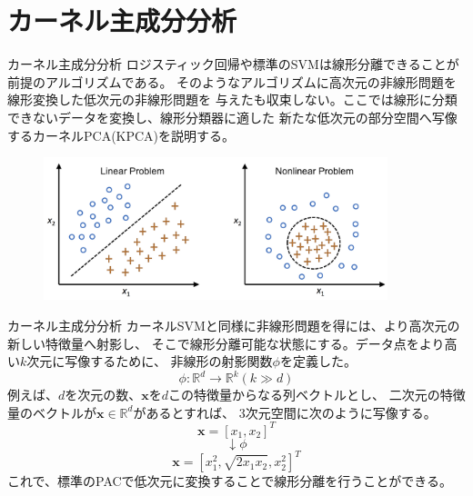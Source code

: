 \documentclass[aspectratio=169, dvipdfmx, 11pt]{beamer} %
\begin{document}
\section{カーネル主成分分析}
\begin{frame}{カーネル主成分分析}
    ロジスティック回帰や標準のSVMは線形分離できることが前提のアルゴリズムである。
    そのようなアルゴリズムに高次元の非線形問題を線形変換した低次元の非線形問題を
    与えたも収束しない。ここでは線形に分類できないデータを変換し、線形分類器に適した
    新たな低次元の部分空間へ写像するカーネルPCA(KPCA)を説明する。
    \begin{figure}[b]
        \begin{center}
        \includegraphics[width=100mm]{img/day05/fig03.png}
        \end{center}
    \end{figure}
\end{frame}

\begin{frame}{カーネル主成分分析}
    カーネルSVMと同様に非線形問題を得には、より高次元の新しい特徴量へ射影し、
    そこで線形分離可能な状態にする。データ点をより高い\(k\)次元に写像するために、
    非線形の射影関数\(\phi\)を定義した。
    \begin{equation*}
        \phi : \mathbb{R}^d \rightarrow \mathbb{R}^k (k \gg d) 
    \end{equation*}
    例えば、\(d\)を次元の数、\(\bm{x}\)を\(d\)この特徴量からなる列ベクトルとし、
    二次元の特徴量のベクトルが\(\bm{x} \in \mathbb{R}^d\)があるとすれば、
    3次元空間に次のように写像する。
    \begin{equation*}
        \bm{x} = [x_1, x_2]^T
    \end{equation*}
    \begin{equation*}
        \downarrow \phi
    \end{equation*}
    \begin{equation*}
        \bm{x} = [x_{1}^{2},\sqrt{2 x_1 x_2} ,x_{2}^{2}]^T
    \end{equation*}
    これで、標準のPACで低次元に変換することで線形分離を行うことができる。
\end{frame}
\end{document}
